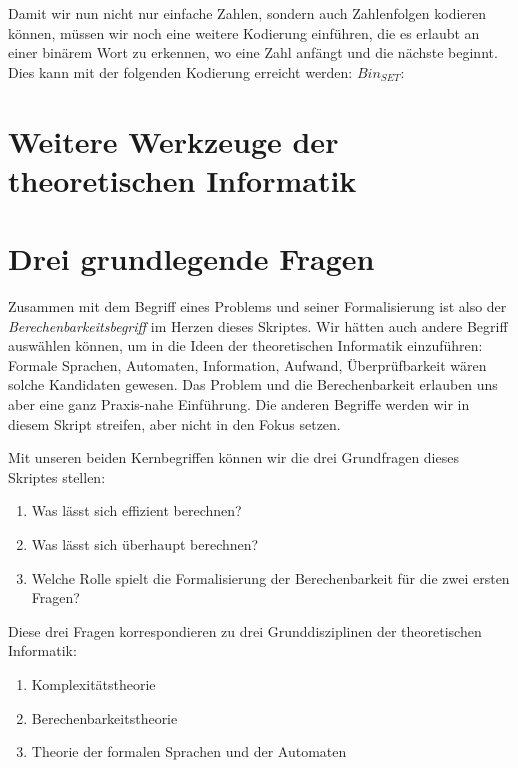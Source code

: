 {Damit wir nun nicht nur einfache Zahlen, sondern auch Zahlenfolgen kodieren können,
müssen wir noch eine weitere Kodierung einführen,
die es erlaubt an einer binärem Wort zu erkennen,
wo eine Zahl anfängt und die nächste beginnt.
Dies kann mit der folgenden Kodierung erreicht werden: 
$Bin_{SET}:$ 







\section{Weitere Werkzeuge der theoretischen Informatik}

\section{Drei grundlegende Fragen}
Zusammen mit dem Begriff eines Problems und seiner Formalisierung ist also der
\emph{Berechenbarkeitsbegriff} im Herzen dieses Skriptes.
Wir hätten auch andere Begriff auswählen können, um in die Ideen der theoretischen Informatik einzuführen:
Formale Sprachen, Automaten, Information, Aufwand, Überprüfbarkeit wären solche Kandidaten gewesen.
Das Problem und die Berechenbarkeit erlauben uns aber eine ganz Praxis-nahe Einführung.
Die anderen Begriffe werden wir in diesem Skript streifen, aber nicht in den Fokus setzen.

Mit unseren beiden Kernbegriffen können wir die drei Grundfragen dieses Skriptes stellen:
\begin{enumerate}
    \item Was lässt sich effizient berechnen?
    \item Was lässt sich überhaupt berechnen?
    \item Welche Rolle spielt die Formalisierung der Berechenbarkeit für die zwei ersten Fragen?
\end{enumerate}

Diese drei Fragen korrespondieren zu drei Grunddisziplinen der theoretischen Informatik:
\begin{enumerate}
    \item Komplexitätstheorie
    \item Berechenbarkeitstheorie
    \item Theorie der formalen Sprachen und der Automaten
\end{enumerate}

}
